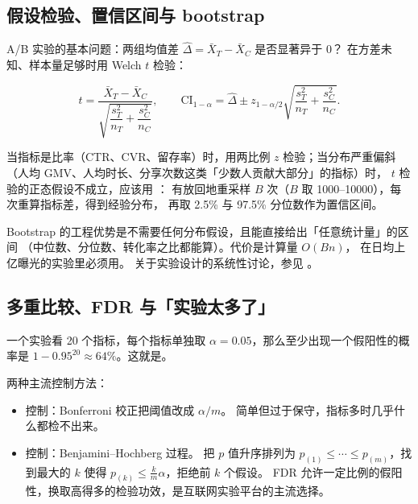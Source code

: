\subsection{假设检验、置信区间与 bootstrap}

A/B 实验的基本问题：两组均值差 $\hat{\Delta} = \bar{X}_T - \bar{X}_C$ 是否显著异于 0？
在方差未知、样本量足够时用 Welch $t$ 检验：

\begin{equation}
t = \frac{\bar{X}_T - \bar{X}_C}{\sqrt{\dfrac{s_T^2}{n_T} + \dfrac{s_C^2}{n_C}}},
\qquad
\text{CI}_{1-\alpha} = \hat{\Delta} \pm z_{1-\alpha/2}\sqrt{\frac{s_T^2}{n_T} + \frac{s_C^2}{n_C}} .
\label{eq:tstat}
\end{equation}

当指标是比率（CTR、CVR、留存率）时，用两比例 $z$ 检验；当分布严重偏斜
（人均 GMV、人均时长、分享次数这类「少数人贡献大部分」的指标）时，
$t$ 检验的正态假设不成立，应该用 ：
有放回地重采样 $B$ 次（$B$ 取 1000--10000），每次重算指标差，得到经验分布，
再取 2.5\% 与 97.5\% 分位数作为置信区间。

Bootstrap 的工程优势是不需要任何分布假设，且能直接给出「任意统计量」的区间
（中位数、分位数、转化率之比都能算）。代价是计算量 $O(Bn)$，
在日均上亿曝光的实验里必须用。
关于实验设计的系统性讨论，参见 \cite{kohavi2020trustworthy}。

\subsection{多重比较、FDR 与「实验太多了」}

一个实验看 20 个指标，每个指标单独取 $\alpha = 0.05$，那么至少出现一个假阳性的概率是
$1 - 0.95^{20} \approx 64\%$。这就是。

两种主流控制方法：

\begin{itemize}
  \item {} 控制：Bonferroni 校正把阈值改成 $\alpha/m$。
        简单但过于保守，指标多时几乎什么都检不出来。
  \item {} 控制：Benjamini--Hochberg 过程。
        把 $p$ 值升序排列为 $p_{(1)} \le \cdots \le p_{(m)}$，找到最大的 $k$ 使得
        $p_{(k)} \le \frac{k}{m}\alpha$，拒绝前 $k$ 个假设。
        FDR 允许一定比例的假阳性，换取高得多的检验功效，是互联网实验平台的主流选择。
\end{itemize}

